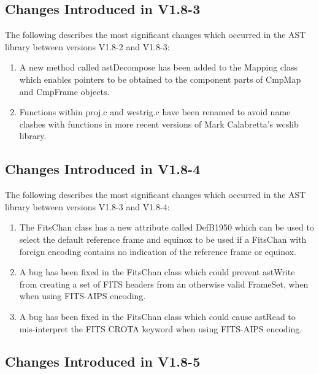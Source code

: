 \documentclass[twoside,11pt]{starlink}
\begin{document}
\subsection{Changes Introduced in V1.8-3}

The following describes the most significant changes which
occurred in the AST library between versions V1.8-2 and V1.8-3:

\begin{enumerate}

\item A new method called astDecompose has been added to the Mapping class
which enables pointers to be obtained to the component parts of CmpMap and
CmpFrame objects.

\item Functions within proj.c and wcstrig.c have been renamed to avoid name
clashes with functions in more recent versions of Mark Calabretta's wcslib
library.

\end{enumerate}

\subsection{Changes Introduced in V1.8-4}

The following describes the most significant changes which
occurred in the AST library between versions V1.8-3 and V1.8-4:

\begin{enumerate}

\item The FitsChan class has a new attribute called DefB1950 which can be
used to select the default reference frame and equinox to be used if
a FitsChan with foreign encoding contains no indication of the
reference frame or equinox.

\item A bug has been fixed in the FitsChan class which could prevent
astWrite from creating a set of FITS headers from an otherwise valid
FrameSet, when when using FITS-AIPS encoding.

\item A bug has been fixed in the FitsChan class which could cause
astRead to mis-interpret the FITS CROTA keyword when using FITS-AIPS
encoding.

\end{enumerate}

\subsection{Changes Introduced in V1.8-5}
\end{document}
